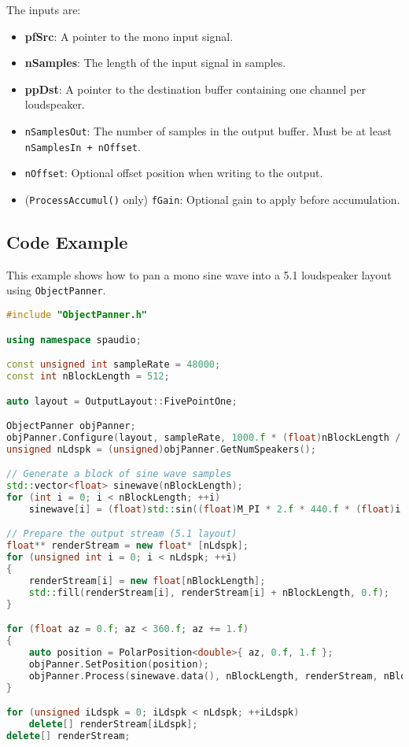 \documentclass[12pt]{report}
\newcommand{\code}[1]{\texttt{#1}}
\begin{document}
The inputs are:

\begin{itemize}
  \item \textbf{pfSrc}: A pointer to the mono input signal.
  \item \textbf{nSamples}: The length of the input signal in samples.
  \item \textbf{ppDst}: A pointer to the destination buffer containing one channel per loudspeaker.
  \item \code{nSamplesOut}: The number of samples in the output buffer. Must be at least \code{nSamplesIn + nOffset}.
  \item \code{nOffset}: Optional offset position when writing to the output.
  \item (\texttt{ProcessAccumul()} only) \code{fGain}: Optional gain to apply before accumulation.
\end{itemize}

\subsection{Code Example}

This example shows how to pan a mono sine wave into a 5.1 loudspeaker layout using \texttt{ObjectPanner}.

\begin{lstlisting}[language=C++, basicstyle=\ttfamily\small]
#include "ObjectPanner.h"

using namespace spaudio;

const unsigned int sampleRate = 48000;
const int nBlockLength = 512;

auto layout = OutputLayout::FivePointOne;

ObjectPanner objPanner;
objPanner.Configure(layout, sampleRate, 1000.f * (float)nBlockLength / (float)sampleRate);
unsigned nLdspk = (unsigned)objPanner.GetNumSpeakers();

// Generate a block of sine wave samples
std::vector<float> sinewave(nBlockLength);
for (int i = 0; i < nBlockLength; ++i)
    sinewave[i] = (float)std::sin((float)M_PI * 2.f * 440.f * (float)i / (float)sampleRate);

// Prepare the output stream (5.1 layout)
float** renderStream = new float* [nLdspk];
for (unsigned int i = 0; i < nLdspk; ++i)
{
    renderStream[i] = new float[nBlockLength];
    std::fill(renderStream[i], renderStream[i] + nBlockLength, 0.f);
}

for (float az = 0.f; az < 360.f; az += 1.f)
{
    auto position = PolarPosition<double>{ az, 0.f, 1.f };
    objPanner.SetPosition(position);
    objPanner.Process(sinewave.data(), nBlockLength, renderStream, nBlockLength);
}

for (unsigned iLdspk = 0; iLdspk < nLdspk; ++iLdspk)
    delete[] renderStream[iLdspk];
delete[] renderStream;
\end{lstlisting}
\end{document}
